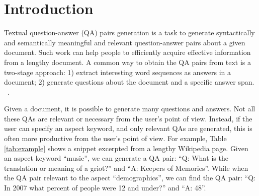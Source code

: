 \section{Introduction}
\label{sec:intro}

Textual question-answer (QA) pairs generation is a task to generate 
syntactically and semantically meaningful and relevant question-answer 
pairs about a given document. 
Such work can help people to 
efficiently acquire effective information from a lengthy document.
A common way to obtain the QA pairs from text is a two-stage approach: 
1) extract interesting word sequences as answers in a document;
2) generate questions about the document and a specific answer span.
~\cite{subramanian2017neural,lovenia2018automatic,kumar2019paraqg,DBLP:journals/corr/abs-1906-02622}.



Given a document, it is possible to generate many questions and answers.
Not all these QAs are relevant or necessary from the user's point of view. 
Instead, if the user can specify an aspect keyword, and only relevant
QAs are generated, this is often more productive from the user's point of
view.
For example, Table \ref{tab:example} shows a snippet excerpted from a lengthy Wikipedia page. 
Given an aspect keyword ``music'', we can generate a QA pair: ``Q: What is the translation or meaning of a griot?'' and ``A: Keepers of Memories''. While when the QA pair relevant to the aspect ``demographics'', we can find the QA pair: ``Q: In 2007 what percent of people were 12 and under?'' and ``A: 48''.


